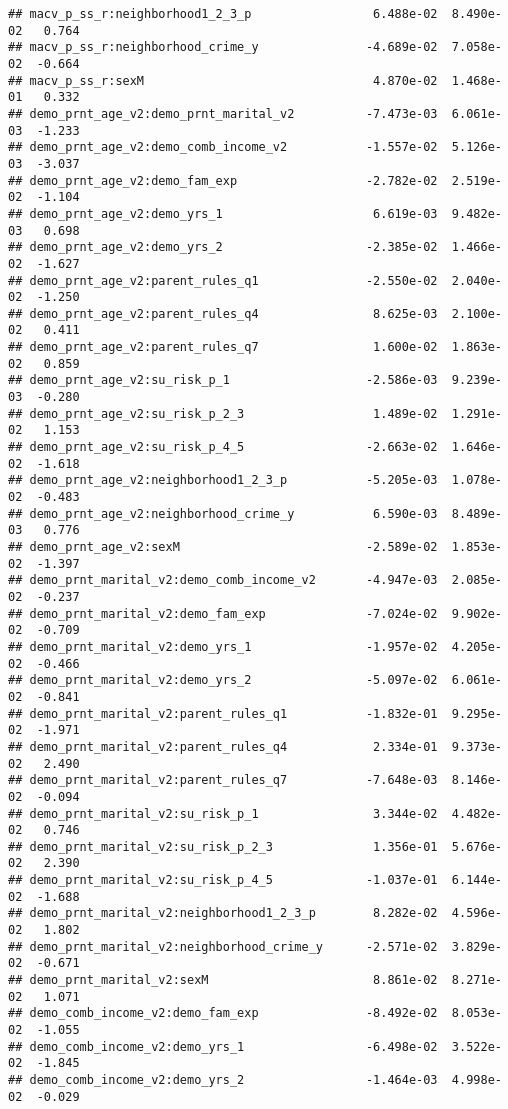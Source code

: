 \documentclass[
]{article}
\begin{document}
\begin{verbatim}
## macv_p_ss_r:neighborhood1_2_3_p                 6.488e-02  8.490e-02   0.764
## macv_p_ss_r:neighborhood_crime_y               -4.689e-02  7.058e-02  -0.664
## macv_p_ss_r:sexM                                4.870e-02  1.468e-01   0.332
## demo_prnt_age_v2:demo_prnt_marital_v2          -7.473e-03  6.061e-03  -1.233
## demo_prnt_age_v2:demo_comb_income_v2           -1.557e-02  5.126e-03  -3.037
## demo_prnt_age_v2:demo_fam_exp                  -2.782e-02  2.519e-02  -1.104
## demo_prnt_age_v2:demo_yrs_1                     6.619e-03  9.482e-03   0.698
## demo_prnt_age_v2:demo_yrs_2                    -2.385e-02  1.466e-02  -1.627
## demo_prnt_age_v2:parent_rules_q1               -2.550e-02  2.040e-02  -1.250
## demo_prnt_age_v2:parent_rules_q4                8.625e-03  2.100e-02   0.411
## demo_prnt_age_v2:parent_rules_q7                1.600e-02  1.863e-02   0.859
## demo_prnt_age_v2:su_risk_p_1                   -2.586e-03  9.239e-03  -0.280
## demo_prnt_age_v2:su_risk_p_2_3                  1.489e-02  1.291e-02   1.153
## demo_prnt_age_v2:su_risk_p_4_5                 -2.663e-02  1.646e-02  -1.618
## demo_prnt_age_v2:neighborhood1_2_3_p           -5.205e-03  1.078e-02  -0.483
## demo_prnt_age_v2:neighborhood_crime_y           6.590e-03  8.489e-03   0.776
## demo_prnt_age_v2:sexM                          -2.589e-02  1.853e-02  -1.397
## demo_prnt_marital_v2:demo_comb_income_v2       -4.947e-03  2.085e-02  -0.237
## demo_prnt_marital_v2:demo_fam_exp              -7.024e-02  9.902e-02  -0.709
## demo_prnt_marital_v2:demo_yrs_1                -1.957e-02  4.205e-02  -0.466
## demo_prnt_marital_v2:demo_yrs_2                -5.097e-02  6.061e-02  -0.841
## demo_prnt_marital_v2:parent_rules_q1           -1.832e-01  9.295e-02  -1.971
## demo_prnt_marital_v2:parent_rules_q4            2.334e-01  9.373e-02   2.490
## demo_prnt_marital_v2:parent_rules_q7           -7.648e-03  8.146e-02  -0.094
## demo_prnt_marital_v2:su_risk_p_1                3.344e-02  4.482e-02   0.746
## demo_prnt_marital_v2:su_risk_p_2_3              1.356e-01  5.676e-02   2.390
## demo_prnt_marital_v2:su_risk_p_4_5             -1.037e-01  6.144e-02  -1.688
## demo_prnt_marital_v2:neighborhood1_2_3_p        8.282e-02  4.596e-02   1.802
## demo_prnt_marital_v2:neighborhood_crime_y      -2.571e-02  3.829e-02  -0.671
## demo_prnt_marital_v2:sexM                       8.861e-02  8.271e-02   1.071
## demo_comb_income_v2:demo_fam_exp               -8.492e-02  8.053e-02  -1.055
## demo_comb_income_v2:demo_yrs_1                 -6.498e-02  3.522e-02  -1.845
## demo_comb_income_v2:demo_yrs_2                 -1.464e-03  4.998e-02  -0.029

\end{verbatim}
\end{document}
